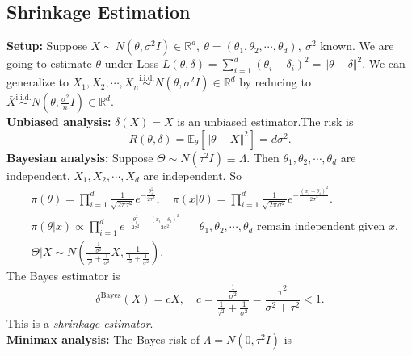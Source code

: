 \documentclass[a4paper]{article}
\begin{document}
\subsection{Shrinkage Estimation}
\textbf{Setup:} Suppose $X \sim N(\theta,\sigma^2 I) \in \mathbb{R}^d, \ \theta = (\theta_1,\theta_2,\cdots, \theta_d), \ \sigma^2$ known. We are going to estimate $\theta$ under Loss $L(\theta,\delta) = \sum\limits_{i=1}^d (\theta_i - \delta_i) ^2 = \Vert \theta - \delta \Vert ^2$. We can generalize to $X_1, X_2, \cdots,X_n \stackrel{\text{i.i.d.}}{\sim} N(\theta,\sigma^2I) \in \mathbb{R}^d$ by reducing to $\bar{X} \stackrel{\text{i.i.d.}}{\sim} N(\theta,\frac{\sigma^2}{n}I) \in \mathbb{R}^d.$\\
\newline
\textbf{Unbiased analysis:} $\delta(X) = X$ is an unbiased estimator.The risk is
\begin{equation}
	R(\theta,\delta) = \mathbb{E}_\theta[\Vert \theta - X \Vert ^2] = d \sigma^2.
\end{equation}
\newline
\textbf{Bayesian analysis:} Suppose $\Theta \sim N(\tau^2 I) \equiv \Lambda$. Then $\theta_1,\theta_2,\cdots,\theta_d$  are independent, $X_1, X_2, \cdots, X_d$ are independent. So
\begin{equation*}
	\begin{aligned}
		& \pi(\theta) = \prod\limits_{i=1}^d \frac{1}{\sqrt{2\pi\tau^2}} e^{-\frac{\theta_i^2}{2\tau^2}}, \quad \pi(x|\theta) = \prod\limits_{i=1}^d \frac{1}{\sqrt{2\pi\sigma^2}} e^{-\frac{(x_i - \theta_i)^2}{2\sigma^2}}.\\
		& \pi(\theta|x) \propto \prod\limits_{i=1}^d e^{-\frac{\theta_i^2}{2\tau^2} -\frac{(x_i - \theta_i)^2}{2\sigma^2}} \quad \text{ $\theta_1,\theta_2,\cdots,\theta_d$ remain independent given $x$}.\\
		& \Theta|X \sim N\left(\frac{\frac{1}{\sigma^2}}{\frac{1}{\tau^2} + \frac{1}{\sigma^2}} X, \frac{1}{\frac{1}{\tau^2} + \frac{1}{\sigma^2}}\right).
	\end{aligned}
\end{equation*}
	The Bayes estimator is
	\begin{equation}
		\delta^{\text{Bayes}}(X) = cX, \quad c = \frac{\frac{1}{\sigma^2}}{\frac{1}{\tau^2} + \frac{1}{\sigma^2}} = \frac{\tau^2}{\sigma^2+\tau^2} < 1.
	\end{equation}
	This is a \emph{shrinkage estimator}.\\
\newline
\textbf{Minimax analysis:} The Bayes risk of $\Lambda = N(0,\tau^2I)$ is
\end{document}
